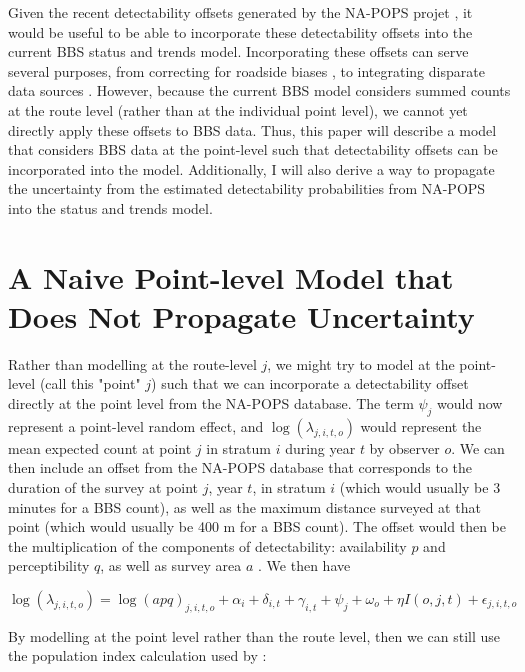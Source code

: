 \documentclass[12pt]{article}
\begin{document}
Given the recent detectability offsets generated by the NA-POPS projet \citep{edwards_point_2023}, it would be useful to be able to incorporate these detectability offsets into the current BBS status and trends model. Incorporating these offsets can serve several purposes, from correcting for roadside biases \citep{thogmartin_sensitivity_2010, solymos_lessons_2020, edwards_point_2023}, to integrating disparate data sources \citep{solymos_calibrating_2013, edwards_point_2023}. However, because the current BBS model considers summed counts at the route level (rather than at the individual point level), we cannot yet directly apply these offsets to BBS data. Thus, this paper will describe a model that considers BBS data at the point-level such that detectability offsets can be incorporated into the model. Additionally, I will also derive a way to propagate the uncertainty from the estimated detectability probabilities from NA-POPS into the status and trends model.

\section{A Naive Point-level Model that Does Not Propagate Uncertainty}

Rather than modelling at the route-level $j$, we might try to model at the point-level (call this "point" $j$) such that we can incorporate a detectability offset directly at the point level from the NA-POPS database. The term $\psi_j$ would now represent a point-level random effect, and $\log(\lambda_{j,i,t,o})$ would represent the mean expected count at point $j$ in stratum $i$ during year $t$ by observer $o$. We can then include an offset from the NA-POPS database that corresponds to the duration of the survey at point $j$, year $t$, in stratum $i$ (which would usually be 3 minutes for a BBS count), as well as the maximum distance surveyed at that point (which would usually be 400 m for a BBS count). The offset would then be the multiplication of the components of detectability: availability $p$ and perceptibility $q$, as well as survey area $a$ \citep{solymos_calibrating_2013}. We then have

\begin{equation}\label{bbs_napops_novar}
	\log(\lambda_{j,i,t,o}) = \log(a p q)_{j,i,t,o} + \alpha_i + \delta_{i,t} + \gamma_{i,t} + \psi_j + \omega_o + \eta I(o,j,t) + \epsilon_{j,i,t,o}
\end{equation}

By modelling at the point level rather than the route level, then we can still use the population index calculation used by \citet{smith_north_2020}:
\end{document}
